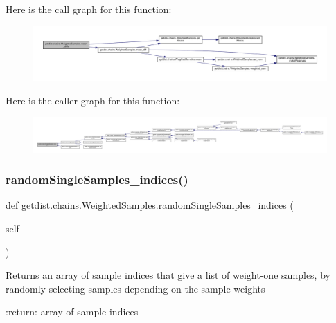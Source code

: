 Here is the call graph for this function\+:
\nopagebreak
\begin{figure}[H]
\begin{center}
\leavevmode
\includegraphics[width=350pt]{classgetdist_1_1chains_1_1WeightedSamples_a22eba6159f13f1185d7359885a6e927c_cgraph}
\end{center}
\end{figure}
Here is the caller graph for this function\+:
\nopagebreak
\begin{figure}[H]
\begin{center}
\leavevmode
\includegraphics[width=350pt]{classgetdist_1_1chains_1_1WeightedSamples_a22eba6159f13f1185d7359885a6e927c_icgraph}
\end{center}
\end{figure}
\mbox{\label{classgetdist_1_1chains_1_1WeightedSamples_a37b625d6d15044bdbb4d59b3ed6680dc}} 
\subsubsection{\texorpdfstring{random\+Single\+Samples\+\_\+indices()}{randomSingleSamples\_indices()}}
{\footnotesize\ttfamily def getdist.\+chains.\+Weighted\+Samples.\+random\+Single\+Samples\+\_\+indices (\begin{DoxyParamCaption}\item[{}]{self }\end{DoxyParamCaption})}

\begin{DoxyVerb}Returns an array of sample indices that give a list of weight-one samples, by randomly
selecting samples depending on the sample weights

:return: array of sample indices
\end{DoxyVerb}
 

